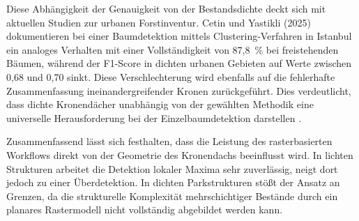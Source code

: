 Diese Abhängigkeit der Genauigkeit von der Bestandsdichte deckt sich mit aktuellen Studien zur urbanen Forstinventur. Cetin und Yastikli (2025) dokumentieren bei einer Baumdetektion mittels Clustering-Verfahren in Istanbul ein analoges Verhalten mit einer Vollständigkeit von 87,8~\% bei freistehenden Bäumen, während der F1-Score in dichten urbanen Gebieten auf Werte zwischen 0,68 und 0,70 sinkt. Diese Verschlechterung wird ebenfalls auf die fehlerhafte Zusammenfassung ineinandergreifender Kronen zurückgeführt. Dies verdeutlicht, dass dichte Kronendächer unabhängig von der gewählten Methodik eine universelle Herausforderung bei der Einzelbaumdetektion darstellen \cite{cetinAutomaticDetectionUrban2025}.

Zusammenfassend lässt sich festhalten, dass die Leistung des rasterbasierten Workflows direkt von der Geometrie des Kronendachs beeinflusst wird. In lichten Strukturen arbeitet die Detektion lokaler Maxima sehr zuverlässig, neigt dort jedoch zu einer Überdetektion. In dichten Parkstrukturen stößt der Ansatz an Grenzen, da die strukturelle Komplexität mehrschichtiger Bestände durch ein planares Rastermodell nicht vollständig abgebildet werden kann.
